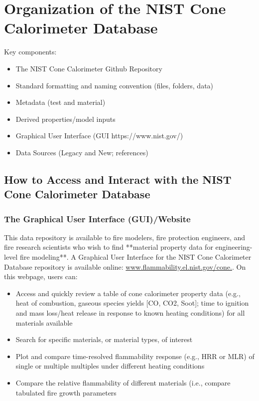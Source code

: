 \section{Organization of the NIST Cone Calorimeter Database} \label{sec:DB-overview}
Key components:
\begin{itemize}
\item The NIST Cone Calorimeter Github Repository
\item Standard formatting and naming convention (files, folders, data)
\item Metadata (test and material)
\item Derived properties/model inputs
\item Graphical User Interface (GUI https://www.nist.gov/)
\item Data Sources (Legacy and New; references)
\end{itemize}

\subsection{How to Access and Interact with the NIST Cone Calorimeter Database} \label{sec:DB-user-interface}
\subsubsection{The Graphical User Interface (GUI)/Website}
This data repository is available to fire modelers, fire protection engineers, and fire research scientists who wish to find **material property data for engineering-level fire modeling**. A Graphical User Interface for the NIST Cone Calorimeter Database repository is available online: \url{www.flammability.el.nist.gov/cone.}. On this webpage, users can:
\begin{itemize}
\item Access and quickly review a table of cone calorimeter property data (e.g., heat of combustion, gaseous species yields [CO, CO2, Soot]; time to ignition and mass loss/heat release in response to known heating conditions) for all materials available
\item Search for specific materials, or material types, of interest
\item Plot and compare time-resolved flammability response (e.g., HRR or MLR) of single or multiple multiples under different heating conditions
\item Compare the relative flammability of different materials (i.e., compare tabulated fire growth parameters~\cite{lyon2024}
\                  
\end{itemize}

